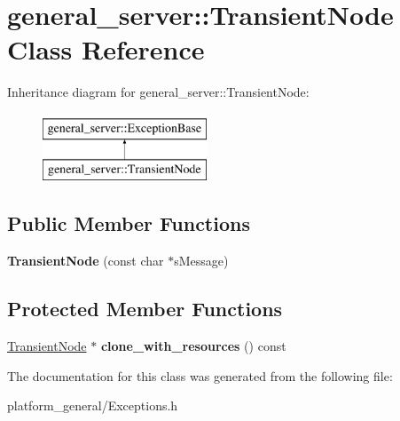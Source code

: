 \hypertarget{classgeneral__server_1_1TransientNode}{\section{general\-\_\-server\-:\-:\-Transient\-Node \-Class \-Reference}
\label{classgeneral__server_1_1TransientNode}
}
\-Inheritance diagram for general\-\_\-server\-:\-:\-Transient\-Node\-:\begin{figure}[H]
\begin{center}
\leavevmode
\includegraphics[height=2.000000cm]{classgeneral__server_1_1TransientNode}
\end{center}
\end{figure}
\subsection*{\-Public \-Member \-Functions}
\begin{DoxyCompactItemize}
\item 
\hypertarget{classgeneral__server_1_1TransientNode_affec749d8a4e9af7ae5bd3b71eb94a10}{{\bfseries \-Transient\-Node} (const char $\ast$s\-Message)}\label{classgeneral__server_1_1TransientNode_affec749d8a4e9af7ae5bd3b71eb94a10}

\end{DoxyCompactItemize}
\subsection*{\-Protected \-Member \-Functions}
\begin{DoxyCompactItemize}
\item 
\hypertarget{classgeneral__server_1_1TransientNode_ad2ef142434c68e3df416aa565a85a3e1}{\hyperlink{classgeneral__server_1_1TransientNode}{\-Transient\-Node} $\ast$ {\bfseries clone\-\_\-with\-\_\-resources} () const }\label{classgeneral__server_1_1TransientNode_ad2ef142434c68e3df416aa565a85a3e1}

\end{DoxyCompactItemize}


\-The documentation for this class was generated from the following file\-:\begin{DoxyCompactItemize}
\item 
platform\-\_\-general/\-Exceptions.\-h\end{DoxyCompactItemize}
